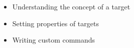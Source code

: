 \begin{itemize}
\item
Understanding the concept of a target

\item
Setting properties of targets

\item
Writing custom commands
\end{itemize}















































